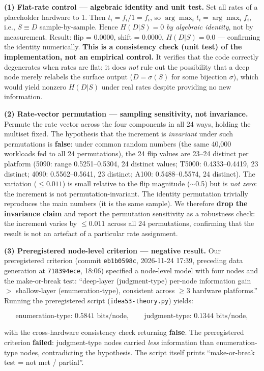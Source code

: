 \documentclass[10pt]{article}
\begin{document}
\textbf{(1) Flat-rate control --- algebraic identity and unit test.} Set all rates of a placeholder hardware to 1. Then $t_i = f_i/1 = f_i$, so $\arg\max_i t_i = \arg\max_i f_i$, i.e., $S \equiv D$ sample-by-sample. Hence $H(D|S) = 0$ \emph{by algebraic identity}, not by measurement. Result: flip = 0.0000, shift = 0.0000, $H(D|S)=0.0$ --- confirming the identity numerically. \textbf{This is a consistency check (unit test) of the implementation, not an empirical control.} It verifies that the code correctly degenerates when rates are flat; it does \emph{not} rule out the possibility that a deep node merely relabels the surface output ($D = \sigma(S)$ for some bijection $\sigma$), which would yield nonzero $H(D|S)$ under real rates despite providing no new information.

\textbf{(2) Rate-vector permutation --- sampling sensitivity, not invariance.} Permute the rate vector across the four components in all 24 ways, holding the multiset fixed. The hypothesis that the increment is \emph{invariant} under such permutations is \textbf{false}: under common random numbers (the same 40,000 workloads fed to all 24 permutations), the 24 flip values are 23--24 distinct per platform (5090: range 0.5251--0.5304, 24 distinct values; T5000: 0.4333--0.4419, 23 distinct; 4090: 0.5562--0.5641, 23 distinct; A100: 0.5488--0.5574, 24 distinct). The variation ($\leq 0.011$) is small relative to the flip magnitude ($\sim$0.5) but is \emph{not zero}: the increment is not permutation-invariant. The identity permutation trivially reproduces the main numbers (it is the same sample). We therefore \textbf{drop the invariance claim} and report the permutation sensitivity as a robustness check: the increment varies by $\leq 0.011$ across all 24 permutations, confirming that the result is not an artefact of a particular rate assignment.

\textbf{(3) Preregistered node-level criterion --- negative result.} Our preregistered criterion (commit \texttt{eb1b0598c}, 2026-11-24 17:39, preceding data generation at \texttt{718394ece}, 18:06) specified a node-level model with four nodes and the make-or-break test: ``deep-layer (judgment-type) per-node information gain $>$ shallow-layer (enumeration-type), consistent across $\geq 3$ hardware platforms.'' Running the preregistered script (\texttt{idea53-theory.py}) yields:

\[
\text{enumeration-type: } 0.5841 \text{ bits/node}, \qquad \text{judgment-type: } 0.1344 \text{ bits/node},
\]

with the cross-hardware consistency check returning \textbf{false}. The preregistered criterion \textbf{failed}: judgment-type nodes carried \emph{less} information than enumeration-type nodes, contradicting the hypothesis. The script itself prints ``make-or-break test = not met / partial''.
\end{document}
